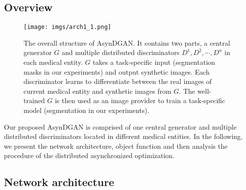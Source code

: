 \subsection{Overview}
\begin{figure*}[h]
\begin{center}
\texttt{[image: imgs/arch1\_1.png]}
\end{center}
\caption{The overall structure of AsynDGAN. It contains two parts, a central generator $G$ and multiple distributed discriminators $D^1, D^2, \cdots, D^n$ in each medical entity. $G$ takes a task-specific input (segmentation masks in our experiments) and output synthetic images. Each discriminator learns to differentiate between the real images of current medical entity and synthetic images from $G$. The well-trained $G$ is then used as an image provider to train a task-specific model (segmentation in our experiments).}
\label{arch1}
\end{figure*}

Our proposed AsynDGAN is comprised of one central generator and multiple distributed discriminators located in different medical entities. 
In the following, we present the network architecture, object function and then analysis the procedure of the distributed asynchronized optimization.

\subsection{Network architecture}

